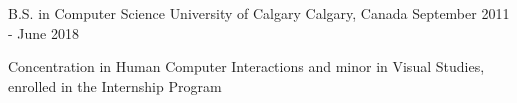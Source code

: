 \begin{cventries}
  \cventry
    {B.S. in Computer Science }
    {University of Calgary}
    {Calgary, Canada}
    {September 2011 - June 2018}
    {
      \begin{cvitems}
      \item {Concentration in Human Computer Interactions and minor in Visual Studies, enrolled in the Internship Program}
      \end{cvitems}
    }
\end{cventries}
